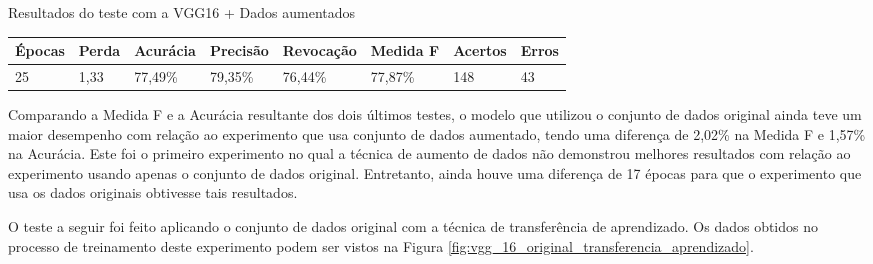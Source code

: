 \documentclass[
	12pt,				%
	oneside,			%
	a4paper,			%
	english,			%
	brazil				%
	]{abntex2ppgsi}
\begin{document}
\begin{quadro}[H]
\caption{Resultados do teste com a VGG16 + Dados aumentados}
\label{quad:resultados_teste_vgg_16_com_dados_aumentados}
\centering
\begin{tabular}{|l|l|l|l|l|l|l|l|}
\cline{1-8}
Épocas & Perda & Acurácia & Precisão & Revocação & Medida F & Acertos & Erros \\ \hline
25 & 1,33 & 77,49\% & 79,35\% & 76,44\% & 77,87\% & 148 & 43 \\
\cline{1-8}
\end{tabular}
\end{quadro}

Comparando a Medida F e a Acurácia resultante dos dois últimos testes, o modelo que utilizou o conjunto de dados original ainda teve um maior desempenho com relação ao experimento que usa conjunto de dados aumentado, tendo uma diferença de 2,02\% na Medida F e 1,57\% na Acurácia. Este foi o primeiro experimento no qual a técnica de aumento de dados não demonstrou melhores resultados com relação ao experimento usando apenas o conjunto de dados original. Entretanto, ainda houve uma diferença de 17 épocas para que o experimento que usa os dados originais obtivesse tais resultados.

O teste a seguir foi feito aplicando o conjunto de dados original com a técnica de transferência de aprendizado. Os dados obtidos no processo de treinamento deste experimento podem ser vistos na Figura \ref{fig:vgg_16_original_transferencia_aprendizado}.
\end{document}
